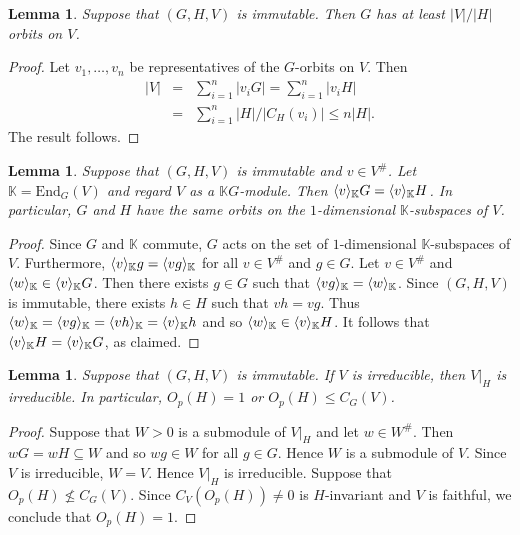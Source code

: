 \documentclass[12pt]{amsart}
\newtheorem{lemma}[theorem]{Lemma}
\theoremstyle{remark}
\theoremstyle{notation}
\theoremstyle{definition}
\newcommand{\0}{\emptyset}
\DeclarePairedDelimiter{\gen}{\langle}{\rangle}
\begin{document}
\begin{lemma}\label{lem:numberorbits} Suppose that $(G,H,V)$ is immutable.  Then $G$ has at least $|V|/|H|$ orbits on $V$.
\end{lemma}

\begin{proof}
Let $v_1, \dots, v_n$ be representatives of the $G$-orbits on $V$. Then \begin{eqnarray*} |V|&=&\sum_{i=1}^n|v_iG|
 = \sum_{i=1}^n|v_iH|\\
&=&\sum_{i=1}^n|H|/|C_H(v_i)| \le n|H|.\end{eqnarray*} The result follows.
\end{proof}

\begin{lemma}\label{same point orbit}
Suppose that $(G,H,V)$ is immutable and $v \in V^\#$. Let $\mathbb K= \mathrm{End}_G(V)$ and regard $V$ as a $\mathbb KG$-module.  Then $\gen{v}_{\mathbb K}G=\gen{v}_{\mathbb K}H$. In particular, $G$ and $H$ have the same orbits on the $1$-dimensional $\mathbb K$-subspaces of $V$.
\end{lemma}
\begin{proof} Since $G$ and $\mathbb K$ commute, $G$ acts on the set of $1$-dimensional $\mathbb K$-subspaces of $V$. Furthermore, $\gen{v}_{\mathbb K}g=\gen{vg}_{\mathbb K}$ for all $v \in V^\#$ and $g \in G$. Let $v \in V^\#$ and $\gen{w}_{\mathbb K}\in \gen{v}_{\mathbb K}G$. Then there exists $g \in G$ such that $\gen{vg}_{\mathbb K}=\gen{w}_{\mathbb K}$. Since $(G,H,V)$ is immutable, there exists $h \in H$ such that $vh=vg$. Thus $\gen{w}_{\mathbb K}=\gen{vg}_{\mathbb K}=\gen{vh}_{\mathbb K}=\gen{v}_{\mathbb K}h$ and so $\gen{w}_{\mathbb K} \in \gen{v}_{\mathbb K}H$. It follows that $\gen{v}_{\mathbb K}H= \gen{v}_{\mathbb K}G$, as claimed.
\end{proof}



\begin{lemma}\label{lem:irred reduct}
Suppose that $(G,H,V)$ is immutable. If $V$ is  irreducible, then $V|_H$ is irreducible. In particular, $O_p(H)=1$ or $O_p(H)\le C_G(V)$.
\end{lemma}


\begin{proof}
Suppose that $W>0$ is a submodule of $V|_H$ and let $w \in W^\#$.  Then $  w  G=   w  H \subseteq W$ and so $w g \in W$ for all $g \in G$.  Hence $W$ is a submodule of $V$.  Since $V$ is irreducible, $W=V$. Hence $V|_H$ is irreducible. Suppose that $O_p(H) \not \le C_G(V)$. Since $C_V(O_p(H)) \ne 0$ is $H$-invariant and $V$ is faithful, we conclude that $O_p(H)=1$.
\end{proof}
\end{document}

